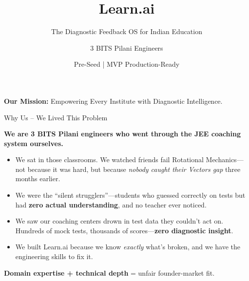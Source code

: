\documentclass[aspectratio=169, 10pt]{beamer}
\title{Learn.ai}
\subtitle{The Diagnostic Feedback OS for Indian Education}
\author{3 BITS Pilani Engineers}
\date{Pre-Seed \enspace | \enspace MVP Production-Ready}
\institute{}
\newcommand{\bspace}{\vspace{0.3em}}
\begin{document}
\begin{frame}[plain]
  \maketitle
  \vfill
  \centering
  \small\textcolor{LearnBlue}{\textbf{Our Mission:} Empowering Every Institute with Diagnostic Intelligence.}
\end{frame}

\begin{frame}{Why Us -- We Lived This Problem}

  \textbf{We are 3 BITS Pilani engineers who went through the JEE coaching system ourselves.}

  \bspace
  \begin{itemize}
    \setlength\itemsep{0.5em}
    \item We sat in those classrooms. We watched friends fail Rotational Mechanics---not because it was hard, but because \emph{nobody caught their Vectors gap} three months earlier.

    \item We were the ``silent strugglers''---students who guessed correctly on tests but had \textbf{zero actual understanding}, and no teacher ever noticed.

    \item We saw our coaching centers drown in test data they couldn't act on. Hundreds of mock tests, thousands of scores---\textbf{zero diagnostic insight}.

    \item We built Learn.ai because we know \emph{exactly} what's broken, and we have the engineering skills to fix it.
  \end{itemize}

  \vspace{0.4em}
  \begin{block}{}
    \centering
    \small \textbf{Domain expertise + technical depth} = unfair founder-market fit.
  \end{block}
\end{frame}
\end{document}
